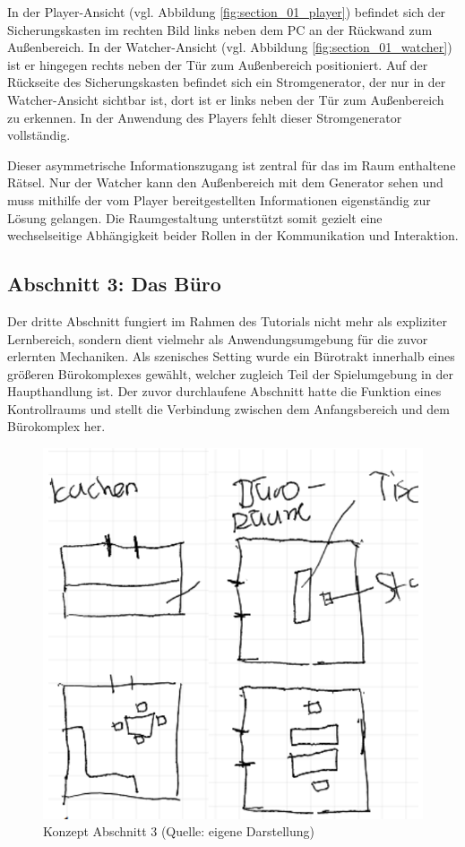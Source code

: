 In der Player-Ansicht (vgl. Abbildung \ref{fig:section_01_player}) befindet sich der Sicherungskasten im rechten Bild links neben dem PC an der Rückwand zum Außenbereich. In der Watcher-Ansicht (vgl. Abbildung \ref{fig:section_01_watcher}) ist er hingegen rechts neben der Tür zum Außenbereich positioniert. Auf der Rückseite des Sicherungskasten befindet sich ein Stromgenerator, der nur in der Watcher-Ansicht sichtbar ist, dort ist er links neben der Tür zum Außenbereich zu erkennen. In der Anwendung des Players fehlt dieser Stromgenerator vollständig.

Dieser asymmetrische Informationszugang ist zentral für das im Raum enthaltene Rätsel. Nur der Watcher kann den Außenbereich mit dem Generator sehen und muss mithilfe der vom Player bereitgestellten Informationen eigenständig zur Lösung gelangen. Die Raumgestaltung unterstützt somit gezielt eine wechselseitige Abhängigkeit beider Rollen in der Kommunikation und Interaktion.

\subsection{Abschnitt 3: Das Büro}

Der dritte Abschnitt fungiert im Rahmen des Tutorials nicht mehr als expliziter Lernbereich, sondern dient vielmehr als Anwendungsumgebung für die zuvor erlernten Mechaniken. Als szenisches Setting wurde ein Bürotrakt innerhalb eines größeren Bürokomplexes gewählt, welcher zugleich Teil der Spielumgebung in der Haupthandlung ist. Der zuvor durchlaufene Abschnitt hatte die Funktion eines Kontrollraums und stellt die Verbindung zwischen dem Anfangsbereich und dem Bürokomplex her.

\begin{figure}[ht]
\centering
\includegraphics[width=0.6\linewidth]{content/pictures/Abschnitt_02_Concept.png}
\caption{Konzept Abschnitt 3 (Quelle: eigene Darstellung)}
\label{fig:section_02_concept}
\end{figure}

